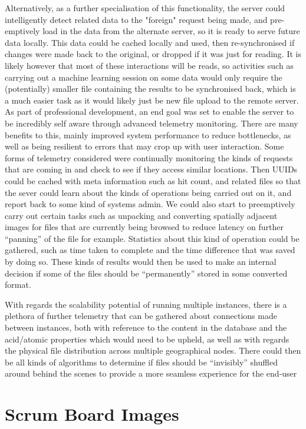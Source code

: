 \documentclass{article}
\begin{document}
Alternatively, as a further specialisation of this functionality, the server could intelligently detect related data to the "foreign" request being made, and pre-emptively load in the data from the alternate server, so it is ready to serve future data locally. This data could be cached locally and used, then re-synchronised if changes were made back to the original, or dropped if it was just for reading. It is likely however that most of these interactions will be reads, so activities such as carrying out a machine learning session on some data would only require the (potentially) smaller file containing the results to be synchronised back, which is a much easier task as it would likely just be new file upload to the remote server.
As part of professional development, an end goal was set to enable the server to be incredibly self aware through advanced telemetry monitoring. There are many benefits to this, mainly improved system performance to reduce bottlenecks, as well as being resilient to errors that may crop up with user interaction.
Some forms of telemetry considered were continually monitoring the kinds of requests that are coming in and check to see if they access similar locations. Then UUIDs could be cached with meta information such as hit count, and related files so that the sever could learn about the kinds of operations being carried out on it, and report back to some kind of systems admin. We could also start to preemptively carry out certain tasks such as unpacking and converting spatially adjacent images for files that are currently being browsed to reduce latency on further “panning” of the file for example. Statistics about this kind of operation could be gathered, such as time taken to complete and the time difference that was saved by doing so. These kinds of results would then be used to make an internal decision if some of the files should be “permanently” stored in some converted format. 

With regards the scalability potential of running multiple instances, there is a plethora of further telemetry that can be gathered about connections made between instances, both with reference to the content in the database and the acid/atomic properties which would need to be upheld, as well as with regards the physical file distribution across multiple geographical nodes.
There could then be all kinds of algorithms to determine if files should be “invisibly” shuffled around behind the scenes to provide a more seamless experience for the end-user
\appendix
\section{Scrum Board Images} \label{app:board}
\end{document}
